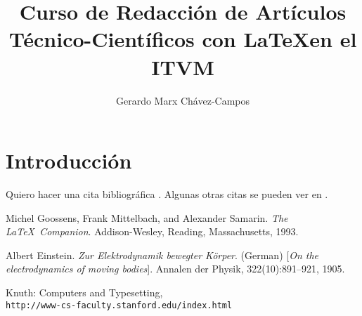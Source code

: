 \documentclass{IEEEtran}
\title{Curso de Redacción de Artículos Técnico-Científicos con \LaTeX en el ITVM}
\author{Gerardo Marx Chávez-Campos}
\begin{document}
\maketitle
\section{Introducción}
\blindtext[1]

Quiero hacer una cita bibliográfica \cite{einstein}. Algunas otras
citas se pueden ver en \cite[pag.25]{knuthwebsite,latexcompanion}.
%
%
\begin{thebibliography}{9}
Michel Goossens, Frank Mittelbach, and Alexander Samarin. 
\textit{The \LaTeX\ Companion}. 
Addison-Wesley, Reading, Massachusetts, 1993.
 
Albert Einstein. 
\textit{Zur Elektrodynamik bewegter K{\"o}rper}. (German) 
[\textit{On the electrodynamics of moving bodies}]. 
Annalen der Physik, 322(10):891–921, 1905.
 
Knuth: Computers and Typesetting,
\\\texttt{http://www-cs-faculty.stanford.edu/index.html}
\end{thebibliography}
\end{document}
